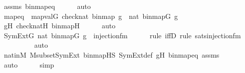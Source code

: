 \begin{isabellebody}
\ assms\ binmap{\isacharunderscore}{\kern0pt}eq\isanewline
\ \ \ \ \isamarkupfalse%
\ auto\isanewline
\isanewline
\ \ \isamarkupfalse%
\ mapeq\ {\isacharcolon}{\kern0pt}\ {\isachardoublequoteopen}map{\isacharparenleft}{\kern0pt}val{\isacharparenleft}{\kern0pt}G{\isacharparenright}{\kern0pt}{\isacharcomma}{\kern0pt}\ {\isacharbrackleft}{\kern0pt}check{\isacharparenleft}{\kern0pt}nat{\isacharparenright}{\kern0pt}{\isacharcomma}{\kern0pt}\ binmap{\isacharprime}{\kern0pt}{\isacharcomma}{\kern0pt}\ g{\isacharprime}{\kern0pt}{\isacharbrackright}{\kern0pt}{\isacharparenright}{\kern0pt}\ {\isacharequal}{\kern0pt}\ {\isacharbrackleft}{\kern0pt}nat{\isacharcomma}{\kern0pt}\ binmap{\isacharparenleft}{\kern0pt}G{\isacharparenright}{\kern0pt}{\isacharcomma}{\kern0pt}\ g{\isacharbrackright}{\kern0pt}{\isachardoublequoteclose}\ \isanewline
\ \ \ \ \isamarkupfalse%
\ g{\isacharprime}{\kern0pt}H\ checknatH\ binmap{\isacharprime}{\kern0pt}H\isanewline
\ \ \ \ \isamarkupfalse%
\ auto\isanewline
\isanewline
\ \ \isamarkupfalse%
\ {\isachardoublequoteopen}SymExt{\isacharparenleft}{\kern0pt}G{\isacharparenright}{\kern0pt}{\isacharcomma}{\kern0pt}\ {\isacharbrackleft}{\kern0pt}nat{\isacharcomma}{\kern0pt}\ binmap{\isacharparenleft}{\kern0pt}G{\isacharparenright}{\kern0pt}{\isacharcomma}{\kern0pt}\ g{\isacharbrackright}{\kern0pt}\ {\isasymTurnstile}\ injection{\isacharunderscore}{\kern0pt}fm{\isacharparenleft}{\kern0pt}{}{\isacharcomma}{\kern0pt}{}{\isacharcomma}{\kern0pt}{}{\isacharparenright}{\kern0pt}{\isachardoublequoteclose}\ \isanewline
\ \ \ \ \isamarkupfalse%
{\isacharparenleft}{\kern0pt}rule\ iffD{}{\isacharcomma}{\kern0pt}\ rule\ sats{\isacharunderscore}{\kern0pt}injection{\isacharunderscore}{\kern0pt}fm{\isacharparenright}{\kern0pt}\isanewline
\ \ \ \ \ \ \ \ \isamarkupfalse%
\ auto{\isacharbrackleft}{\kern0pt}{}{\isacharbrackright}{\kern0pt}\isanewline
\ \ \ \ \isamarkupfalse%
\ nat{\isacharunderscore}{\kern0pt}in{\isacharunderscore}{\kern0pt}M\ M{\isacharunderscore}{\kern0pt}subset{\isacharunderscore}{\kern0pt}SymExt\ binmap{\isacharprime}{\kern0pt}{\isacharunderscore}{\kern0pt}HS\ SymExt{\isacharunderscore}{\kern0pt}def\ gH\ binmap{\isacharunderscore}{\kern0pt}eq\ assms\isanewline
\ \ \ \ \ \ \ \isamarkupfalse%
\ auto{\isacharbrackleft}{\kern0pt}{}{\isacharbrackright}{\kern0pt}\isanewline
\ \ \ \ \isamarkupfalse%
\ simp\isanewline

\end{isabellebody}
